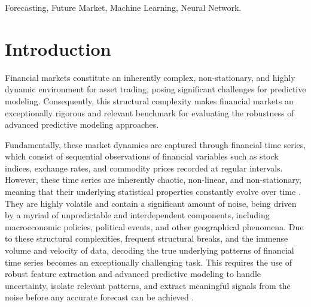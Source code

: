 \documentclass{ieeeaccess}
\begin{document}
\begin{keywords}
Forecasting, Future Market, Machine Learning, Neural Network.

\end{keywords}

\titlepgskip=-15pt

\maketitle

\section{Introduction}
\label{sec:introduction}
Financial markets constitute an inherently complex, non-stationary, and highly dynamic environment for asset trading, posing significant challenges for predictive modeling. Consequently, this structural complexity makes financial markets an exceptionally rigorous and relevant benchmark for evaluating the robustness of advanced predictive modeling approaches.

Fundamentally, these market dynamics are captured through financial time series, which consist of sequential observations of financial variables such as stock indices, exchange rates, and commodity prices recorded at regular intervals. However, these time series are inherently chaotic, non-linear, and non-stationary, meaning that their underlying statistical properties constantly evolve over time \cite{durairaj2022convolutional} \cite{de2025enhancing}. They are highly volatile and contain a significant amount of noise, being driven by a myriad of unpredictable and interdependent components, including macroeconomic policies, political events, and other geographical phenomena. Due to these structural complexities, frequent structural breaks, and the immense volume and velocity of data, decoding the true underlying patterns of financial time series becomes an exceptionally challenging task. This requires the use of robust feature extraction and advanced predictive modeling to handle uncertainty, isolate relevant patterns, and extract meaningful signals from the noise before any accurate forecast can be achieved \cite{praveen2026financial} \cite{de2025enhancing}.
\end{document}
